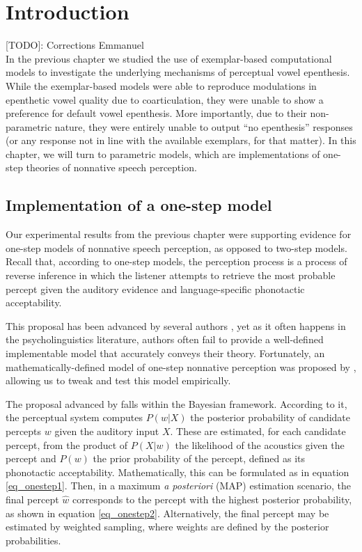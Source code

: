 \newpage
\section{Introduction}

{\color{red}[TODO]: Corrections Emmanuel} \\

In the previous chapter we studied the use of exemplar-based computational models to investigate the underlying mechanisms of perceptual vowel epenthesis. While the exemplar-based models were able to reproduce modulations in epenthetic vowel quality due to coarticulation, they were unable to show a preference for default vowel epenthesis. More importantly, due to their non-parametric nature, they were entirely unable to output ``no epenthesis'' responses (or any response not in line with the available exemplars, for that matter). In this chapter, we will turn to parametric models, which are implementations of one-step theories of nonnative speech perception.  

\subsection{Implementation of a one-step model}
Our experimental results from the previous chapter were supporting evidence for one-step models of nonnative speech perception, as opposed to two-step models.
Recall that, according to one-step models, the perception process is a process of reverse inference in which the listener attempts to retrieve the most probable percept given the auditory evidence and language-specific phonotactic acceptability.

This proposal has been advanced by several authors \cite{dupoux2011, dejong2012, wilson2013, durvasula2015}, yet as it often happens in the psycholinguistics literature, authors often fail to provide a well-defined implementable model that accurately conveys their theory. Fortunately, an mathematically-defined model of one-step nonnative perception was proposed by \cite{wilson2013}, allowing us to tweak and test this model empirically.

The proposal advanced by \cite{wilson2013} falls within the Bayesian framework. 
According to it, the perceptual system computes $P(w | X)$ the posterior probability of candidate percepts $w$ given the auditory input $X$. These are estimated, for each candidate percept, from the product of $P(X|w)$ the likelihood of the acoustics given the percept and $P(w)$ the prior probability of the percept, defined as its phonotactic acceptability. Mathematically, this can be formulated as in equation \ref{eq_onestep1}. Then, in a maximum \textit{a posteriori} (MAP) estimation scenario, the final percept $\widehat{w}$ corresponds to the percept with the highest posterior probability, as shown in equation \ref{eq_onestep2}. Alternatively, the final percept may be estimated by weighted sampling, where weights are defined by the posterior probabilities.     


